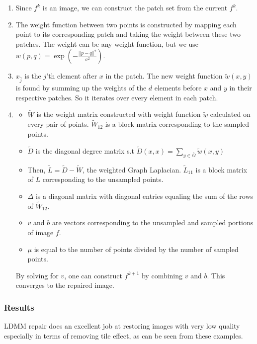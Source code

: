 \documentclass[a4paper]{article}
\begin{document}
\begin{enumerate}
\item Since $f^k$ is an image, we can construct the patch set from the current $f^k$.

\item The weight function between two points is constructed by mapping each point to its corresponding patch and taking the weight between these two patches. The weight can be any weight function, but we use $ w(p,q) = \exp(- \frac{\vert \vert p - q \vert \vert ^2}{\sigma^2})$.

\item $x_{\hat{j}}$ is the $j$'th element after $x$ in the patch. The new weight function $\tilde{w}(x,y)$ is found by summing up the weights of the $d$ elements before $x$ and $y$ in their respective patches. So it iterates over every element in each patch.

\item \begin{itemize}
\item $\tilde{W}$ is the weight matrix constructed with weight function $\tilde{w}$ calculated on every pair of points. $\tilde{W}_{12}$ is a block matrix corresponding to the sampled points.
\item $\tilde{D}$ is the diagonal degree matrix s.t $\tilde{D}(x,x) = \sum\limits_{y \in \bar{\Omega}} \tilde{w}(x,y)$
\item Then, $\tilde{L} = \tilde{D} - \tilde{W}$, the weighted Graph Laplacian. $\tilde{L}_{11}$ is a block matrix of $L$ corresponding to the unsampled points.
\item $\Delta$ is a diagonal matrix with diagonal entries equaling the sum of the rows of $\tilde{W}_{12}$.
\item $v$ and $b$ are vectors corresponding to the unsampled and sampled portions of image $f$.
\item $\mu$ is equal to the number of points divided by the number of sampled points.
\end{itemize}

By solving for $v$, one can construct $f^{k+1}$ by combining $v$ and $b$. This converges to the repaired image.

\end{enumerate}

\subsubsection{Results}


LDMM repair does an excellent job at restoring images with very low quality especially in terms of removing tile effect, as can be seen from these examples.
\end{document}
